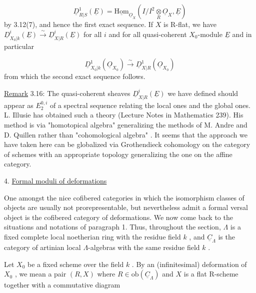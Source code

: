 \begin{equation*}
\underline{D}^1_{R|S}(\underline{E}) = \underline{\mathrm{Hom}}_{\underline{O}_X}(I/I^2\underset{R}{\otimes}\underline{O}_X, \underline{E})
\end{equation*}
by 3.12(7), and hence the first exact sequence. If  $X$  is R-flat, we have
$\underline{D}^i_{X_0|k}(\underline{E}) \overset{\sim}{\to} \underline{D}^i_{X|R}(\underline{E})$  for all  $i$  and for all quasi-coherent $X_0$-module  $\underline{E}$  and in particular

\begin{equation*}
\underline{D}^1_{X_0|k}(\underline{O}_{X_0}) \overset{\sim}{\to} \underline{D}^1_{X|R}(\underline{O}_{X_0})
\end{equation*}
from which the second exact sequence follows.

\underline{Remark} 3.16:  The quasi-coherent sheaves  $\underline{D}^i_{X|R}(\underline{E})$  we have defined should appear as  $E_2^{0,i}$  of a spectral sequence relating the local ones and the global ones. L. Illusie has obtained such a theory (Lecture Notes in Mathematics 239). His method is via  "homotopical algebra"  generalizing the methods of M. Andre and D. Quillen rather than  "cohomological algebra" . It seems that the approach we have taken here can be globalized via Grothendieck cohomology on the category of schemes with an appropriate topology generalizing the one on the affine category.


4.  \underline{Formal moduli of deformations}

One amongst the nice cofibered categories in which the isomorphism classes of objects are usually not prorepresentable, but nevertheless admit a formal versal object is the cofibered category of deformations. We now come back to the situations and notations of paragraph 1. Thus, throughout the section,  $\Lambda$  is a fixed complete local noetherian ring with the residue field  $k$ , and  $\underline{C}_{\Lambda}$  is the category of artinian local $\Lambda$-algebras with the same residue field  $k$ .

Let  $X_0$  be a fixed scheme over the field  $k$ . By an (infinitesimal) deformation of  $X_0$ , we mean a pair  $(R, X)$  where  $R \in \mathrm{ob}(\underline{C}_{\Lambda})$  and  $X$  is a flat R-scheme together with a commutative diagram


